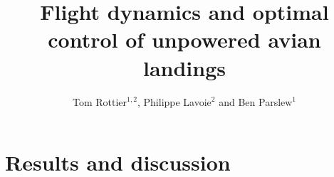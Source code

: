 \documentclass{rsproca_new}
\begin{document}
\title{Flight dynamics and optimal control of unpowered avian landings}
\author{%
    Tom Rottier$^{1,2}$, Philippe Lavoie$^{2}$ and Ben Parslew$^{1}$}

\address{$^{1}$Department of Mechanical and Aerospace Engineering, University of Manchester, Manchester, UK\\
    $^{2}$University of Toronto Institute for Aerospace Studies, Toronto, Canada}
\subject{Biomechanics, Mathematical modelling, Fluid mechanics}


\begin{abstract}
    
\end{abstract}
\maketitle




\FloatBarrier

\section{Results and discussion}

\FloatBarrier

\FloatBarrier

\FloatBarrier

\FloatBarrier

\FloatBarrier



\vskip2pc


\end{document}
